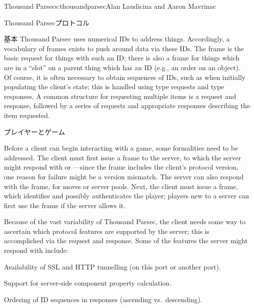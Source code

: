 \begin{aosachapter}{Thousand Parsec}{s:thousandparsec}{Alan Laudicina and Aaron Mavrinac}
\begin{aosasect1}{Thousand Parsecプロトコル}
\begin{aosasect2}{基本}
Thousand Parsec uses numerical IDs to address things. Accordingly, a
vocabulary of frames exists to push around data via these IDs. The
 frame is the basic request for things with such an
ID; there is also a  frame for things which
are in a ``slot'' on a parent thing which has an ID (e.g., an order on
an object). Of course, it is often necessary to obtain sequences of
IDs, such as when initially populating the client's state; this is
handled using  type requests and  type responses. A common structure for requesting multiple
items is a  request and 
response, followed by a series of  requests and
appropriate responses describing the item requested.

\end{aosasect2}

\begin{aosasect2}{プレイヤーとゲーム}

Before a client can begin interacting with a game, some formalities
need to be addressed. The client must first issue a 
frame to the server, to which the server might respond with 
or ---since the  frame includes the client's
protocol version, one reason for failure might be a version
mismatch. The server can also respond with the  frame,
for moves or server pools. Next, the client must issue a 
frame, which identifies and possibly authenticates the player; players
new to a server can first use the  frame if the
server allows it.

Because of the vast variability of Thousand Parsec, the client needs
some way to ascertain which protocol features are supported by the
server; this is accomplished via the  request and
 response. Some of the features the server might
respond with include:

\begin{aosaitemize}

  \item Availability of SSL and HTTP tunnelling (on this port or another
  port).

  \item Support for server-side component property calculation.

  \item Ordering of ID sequences in responses (ascending vs.\ descending).


\end{aosaitemize}
\end{aosasect2}
\end{aosasect1}
\end{aosachapter}
